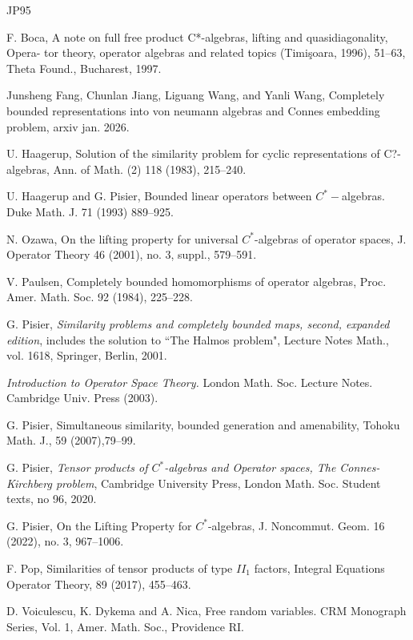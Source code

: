 \documentclass[11pt,leqno]{article}
\theoremstyle{plain}
\theoremstyle{definition}
\theoremstyle{remark}
\numberwithin{equation}{section}
\begin{document}
  \vfill\eject
      \begin{thebibliography}{JP95}
      
         F. Boca, A note on full free product C*-algebras, lifting and quasidiagonality, Opera- tor theory, operator algebras and related topics (Timi\c soara, 1996), 51--63, Theta Found., Bucharest, 1997.
       
         Junsheng Fang, Chunlan Jiang, Liguang Wang, and Yanli Wang,
      Completely bounded representations into von neumann algebras and Connes embedding problem,
      arxiv jan. 2026.

 U. Haagerup, Solution of the similarity problem for cyclic representations of C?-algebras,  Ann. of Math.
(2) 118 (1983), 215--240.

 U. Haagerup and G. Pisier, Bounded linear operators between
$C^*-$algebras. Duke Math. J. 71 (1993)  889--925.

 N. Ozawa,  On the lifting property for universal $C^*$-algebras of operator spaces, J. Operator Theory 46 (2001), no. 3, suppl., 579--591.

 V. Paulsen,
Completely bounded homomorphisms of operator algebras, Proc. Amer. Math. Soc. 92 (1984), 225--228.



       G.  Pisier,  {\it  Similarity problems and completely bounded maps, second, expanded edition}, includes the solution to ``The Halmos problem", Lecture Notes Math., vol. 1618, Springer, Berlin, 2001.
      
       {\it Introduction to Operator Space Theory.}
London Math. Soc. Lecture Notes. Cambridge Univ. Press (2003).
 

      G. Pisier, Simultaneous similarity, bounded generation and amenability, Tohoku Math. J., 59 (2007),79--99.
      
       G. Pisier, {\it Tensor products of $C^*$-algebras and Operator spaces, The Connes-Kirchberg problem},
Cambridge University Press, 
London Math. Soc. Student texts, no 96, 2020.
      
        G.  Pisier,   On the    Lifting  Property for $C^*$-algebras, J. Noncommut. Geom. 16 (2022), no. 3, 967--1006.
      
      \bibitem{[19]} F. Pop, Similarities of tensor products of type $II_1$ factors, Integral Equations Operator Theory,
89 (2017), 455--463.

 D. Voiculescu, K. Dykema and  A. Nica,  Free random variables. CRM Monograph
Series, Vol. 1, Amer. Math. Soc., Providence RI.

      \end{thebibliography}
\end{document}
